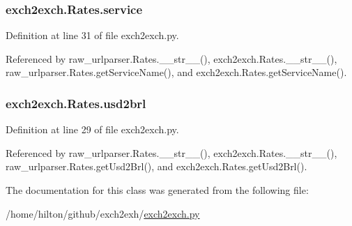 \hypertarget{classexch2exch_1_1_rates_a94c1394b9259d6a7c8f3c12bbd20e685}{
\subsubsection[{service}]{\setlength{\rightskip}{0pt plus 5cm}exch2exch.\-Rates.\-service}}\label{classexch2exch_1_1_rates_a94c1394b9259d6a7c8f3c12bbd20e685}


Definition at line 31 of file exch2exch.\-py.



Referenced by raw\-\_\-urlparser.\-Rates.\-\_\-\-\_\-str\-\_\-\-\_\-(), exch2exch.\-Rates.\-\_\-\-\_\-str\-\_\-\-\_\-(), raw\-\_\-urlparser.\-Rates.\-get\-Service\-Name(), and exch2exch.\-Rates.\-get\-Service\-Name().

\hypertarget{classexch2exch_1_1_rates_ab79ad6e4a42ca358e6b39c825a4b8a0b}{
\subsubsection[{usd2brl}]{\setlength{\rightskip}{0pt plus 5cm}exch2exch.\-Rates.\-usd2brl}}\label{classexch2exch_1_1_rates_ab79ad6e4a42ca358e6b39c825a4b8a0b}


Definition at line 29 of file exch2exch.\-py.



Referenced by raw\-\_\-urlparser.\-Rates.\-\_\-\-\_\-str\-\_\-\-\_\-(), exch2exch.\-Rates.\-\_\-\-\_\-str\-\_\-\-\_\-(), raw\-\_\-urlparser.\-Rates.\-get\-Usd2\-Brl(), and exch2exch.\-Rates.\-get\-Usd2\-Brl().



The documentation for this class was generated from the following file\-:\begin{DoxyCompactItemize}
\item 
/home/hilton/github/exch2exh/\hyperlink{exch2exch_8py}{exch2exch.\-py}\end{DoxyCompactItemize}
